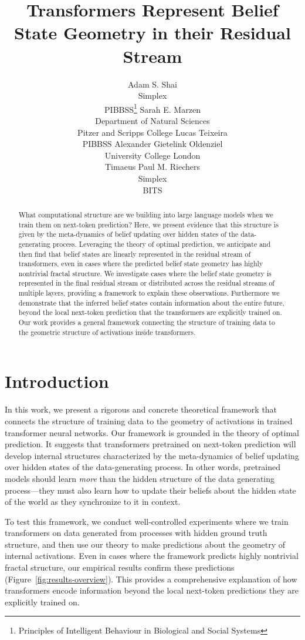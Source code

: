 \documentclass{article}
\title{Transformers Represent Belief State Geometry in their Residual Stream}
\author{%
Adam S. Shai\\
Simplex\\
PIBBSS\thanks{Principles of Intelligent Behaviour in Biological and Social Systems}
\And
Sarah E. Marzen\\
Department of Natural Sciences\\
Pitzer and Scripps College
\And
Lucas Teixeira\\
PIBBSS
\And
Alexander Gietelink Oldenziel\\
University College London\\
Timaeus
\And
Paul M. Riechers\\
Simplex\\
BITS
%
%
}
\begin{document}
\maketitle


\begin{abstract}
What computational structure are we building into large language models when we train them on next-token prediction? Here, we present evidence that this structure is given by the meta-dynamics of belief updating over hidden states of the data-generating process. Leveraging the theory of optimal prediction, we anticipate and then find that belief states are linearly represented in the residual stream of transformers, even in cases where the predicted belief state geometry has highly nontrivial fractal structure. We investigate cases where the belief state geometry is represented in the final residual stream or distributed across the residual streams of multiple layers, providing a framework to explain these observations. Furthermore we demonstrate that the inferred belief states contain information about the entire future, beyond the local next-token prediction that the transformers are explicitly trained on. Our work provides a general framework connecting the structure of training data to the geometric structure of activations inside transformers.
\end{abstract}

\section{Introduction}


In this work, we present a rigorous and concrete theoretical framework that connects the structure of training data to the geometry of activations in trained transformer neural networks. Our framework is grounded in the theory of optimal prediction. It suggests that transformers pretrained on next-token prediction will develop internal structures characterized by the meta-dynamics of belief updating over hidden states of the data-generating process. In other words, pretrained models should learn \emph{more} than 
the hidden structure of the data generating process---they must also learn how to update their beliefs about the hidden state of the world as they synchronize to it in context.

To test this framework, we conduct well-controlled experiments where we train transformers on data generated from processes with hidden ground truth structure, and then use our theory to make predictions about the geometry of internal activations. Even in cases where the framework predicts highly nontrivial fractal structure, our empirical results confirm these predictions (Figure~\ref{fig:results-overview}). This provides a comprehensive explanation of how transformers encode information beyond the local next-token predictions they are explicitly trained on.
\end{document}
